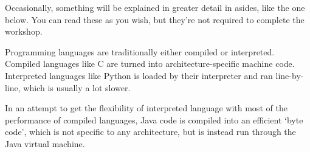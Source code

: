 Occasionally, something will be explained in greater detail in asides, like the one below. You can read these as you wish, but they're not required to complete the workshop.
	
\begin{aside}
	Programming languages are traditionally either compiled or interpreted. Compiled languages like C are turned into architecture-specific machine code. Interpreted languages like Python is loaded by their interpreter and ran line-by-line, which is usually a lot slower.
	
	In an attempt to get the flexibility of interpreted language with most of the performance of compiled languages, Java code is compiled into an efficient `byte code', which is not specific to any architecture, but is instead run through the Java virtual machine.
\end{aside}